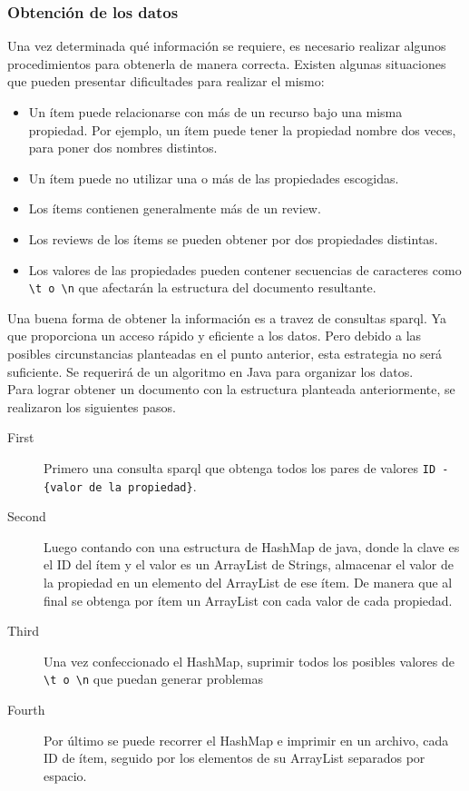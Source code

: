 \subsubsection{Obtención de los datos}
Una vez determinada qué información se requiere, es necesario realizar algunos procedimientos para obtenerla de manera correcta.
Existen algunas situaciones que pueden presentar dificultades para realizar el mismo:\\
\begin{itemize}
 \item Un ítem puede relacionarse con más de un recurso bajo una misma propiedad. Por ejemplo, un ítem puede tener la propiedad nombre dos veces, para poner dos nombres distintos.
 \item Un ítem puede no utilizar una o más de las propiedades escogidas.
 \item Los ítems contienen generalmente más de un review.
 \item Los reviews de los ítems se pueden obtener por dos propiedades distintas.
 \item Los valores de las propiedades pueden contener secuencias de caracteres como \verb|\t o \n| que afectarán la estructura del documento resultante.
\end{itemize}

Una buena forma de obtener la información es a travez de consultas sparql. Ya que proporciona un acceso rápido y eficiente a los datos.
Pero debido a las posibles circunstancias planteadas en el punto anterior, esta estrategia no será suficiente. Se requerirá de un algoritmo en Java
para organizar los datos.\\
Para lograr obtener un documento con la estructura planteada anteriormente, se realizaron los siguientes pasos.
\begin{description}
  \item[First] Primero una consulta sparql que obtenga todos los pares de valores \verb|ID - {valor de la propiedad}|. 
  \item[Second] Luego contando con una estructura de HashMap de java, donde la clave es el ID del ítem y el valor es un ArrayList 
  de Strings, almacenar el valor de la propiedad en un elemento del ArrayList de ese ítem. De manera que al final se obtenga por ítem un ArrayList con cada valor de cada propiedad.
  \item[Third] Una vez confeccionado el HashMap, suprimir todos los posibles valores de \verb|\t o \n| que puedan generar problemas
  \item[Fourth] Por último se puede recorrer el HashMap e imprimir en un archivo, cada ID de ítem, seguido por los elementos de su ArrayList separados por espacio. 
\end{description}

